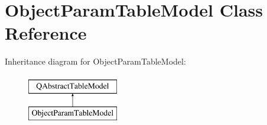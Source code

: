 \hypertarget{class_object_param_table_model}{}\section{Object\+Param\+Table\+Model Class Reference}
\label{class_object_param_table_model}
Inheritance diagram for Object\+Param\+Table\+Model\+:\begin{figure}[H]
\begin{center}
\leavevmode
\includegraphics[height=2.000000cm]{class_object_param_table_model}
\end{center}
\end{figure}

